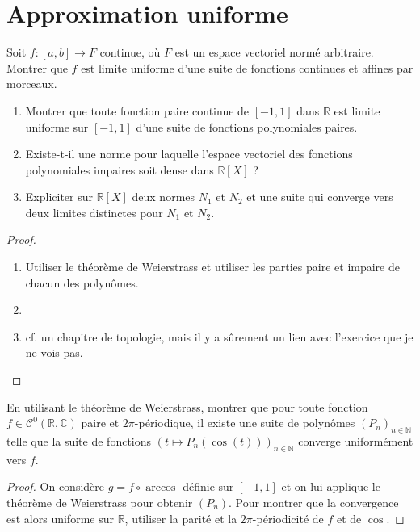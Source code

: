 \documentclass[french,a4paper]{article}
\newcommand{\N}{\mathbb{N}}
\newcommand{\R}{\mathbb{R}}
\newcommand{\C}{\mathbb{C}}
\theoremstyle{plain}
\theoremstyle{definition}
\theoremstyle{remark}
\begin{document}
\section{Approximation uniforme}

\begin{ex}{}
	Soit $f:[a,b]\to F$ continue, où $F$ est un espace vectoriel normé arbitraire. Montrer que $f$ est limite uniforme d'une suite de fonctions continues et affines par morceaux.
\end{ex}

\begin{ex}{}
	\begin{enumerate}
		\item Montrer que toute fonction paire continue de $[-1,1]$ dans $\R$ est limite uniforme sur $[-1,1]$ d'une suite de fonctions polynomiales paires.
		\item Existe-t-il une norme pour laquelle l'espace vectoriel des fonctions polynomiales impaires soit dense dans $\R[X]$ ?
		\item Expliciter sur $\R[X]$ deux normes $N_1$ et $N_2$ et une suite qui converge vers deux limites distinctes pour $N_1$ et $N_2$.
	\end{enumerate}
\end{ex}
\begin{proof}
	\begin{enumerate}
		\item Utiliser le théorème de Weierstrass et utiliser les parties paire et impaire de chacun des polynômes.
		\item 
		\item cf. un chapitre de topologie, mais il y a sûrement un lien avec l'exercice que je ne vois pas.
	\end{enumerate}
\end{proof}

\begin{ex}{}
	En utilisant le théorème de Weierstrass, montrer que pour toute fonction $f\in\mathcal{C}^0(\R,\C)$ paire et $2\pi$-périodique, il existe une suite de polynômes $(P_n)_{n\in\N}$ telle que la suite de fonctions $(t\mapsto P_n(\cos(t)))_{n\in\N}$ converge uniformément vers $f$.
\end{ex}
\begin{proof}
	On considère $g=f\circ\arccos$ définie sur $[-1,1]$ et on lui applique le théorème de Weierstrass pour obtenir $(P_n)$. Pour montrer que la convergence est alors uniforme sur $\R$, utiliser la parité et la $2\pi$-périodicité de $f$ et de $\cos$.
\end{proof}
\end{document}
